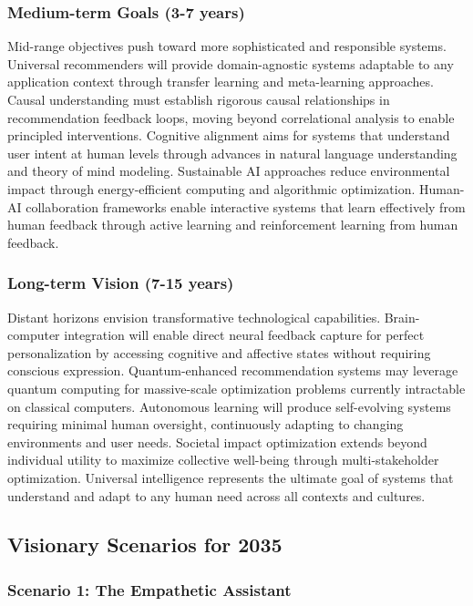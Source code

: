 \subsubsection{Medium-term Goals (3-7 years)}

Mid-range objectives push toward more sophisticated and responsible systems. Universal recommenders will provide domain-agnostic systems adaptable to any application context through transfer learning and meta-learning approaches. Causal understanding must establish rigorous causal relationships in recommendation feedback loops, moving beyond correlational analysis to enable principled interventions. Cognitive alignment aims for systems that understand user intent at human levels through advances in natural language understanding and theory of mind modeling. Sustainable AI approaches reduce environmental impact through energy-efficient computing and algorithmic optimization. Human-AI collaboration frameworks enable interactive systems that learn effectively from human feedback through active learning and reinforcement learning from human feedback.

\subsubsection{Long-term Vision (7-15 years)}

Distant horizons envision transformative technological capabilities. Brain-computer integration will enable direct neural feedback capture for perfect personalization by accessing cognitive and affective states without requiring conscious expression. Quantum-enhanced recommendation systems may leverage quantum computing for massive-scale optimization problems currently intractable on classical computers. Autonomous learning will produce self-evolving systems requiring minimal human oversight, continuously adapting to changing environments and user needs. Societal impact optimization extends beyond individual utility to maximize collective well-being through multi-stakeholder optimization. Universal intelligence represents the ultimate goal of systems that understand and adapt to any human need across all contexts and cultures.

\subsection{Visionary Scenarios for 2035}

\subsubsection{Scenario 1: The Empathetic Assistant}

